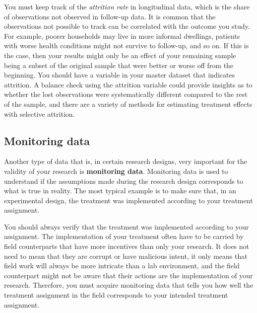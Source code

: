 You must keep track of the \textit{attrition rate} in longitudinal data,
which is the share of observations not observed in follow-up data.
It is common that the observations not possible to track
can be correlated with the outcome you study.
For example, poorer households may live in more informal dwellings,
patients with worse health conditions might not survive to follow-up,
and so on.
If this is the case, then your results might only be an effect of your remaining sample
being a subset of the original sample that were better or worse off from the beginning.
You should have a variable in your master dataset that indicates attrition.
A balance check using the attrition variable could provide insights
as to whether the lost observations were systematically different
compared to the rest of the sample,
and there are a variety of methods for estimating treatment effects
with selective attrition.

\subsection{Monitoring data}

Another type of data that is, in certain research designs,
very important for the validity of your research is \textbf{monitoring data}.
Monitoring data is used to understand if the
assumptions made during the research design corresponds to what is true in reality.
The most typical example is to make sure that, in an experimental design,
the treatment was implemented according to your treatment assignment.

You should always verify that the treatment was implemented according to your assignment.
The implementation of your treatment often have to be carried by field counterparts
that have more incentives than only your research.
It does not need to mean that they are corrupt or have malicious intent, 
it only means that field work will always be more intricate than a lab environment, 
and the field counterpart might not be aware that their actions are the implementation of your research.
Therefore, you must acquire monitoring data that tells you how well the treatment assignment in the field
corresponds to your intended treatment assignment.


